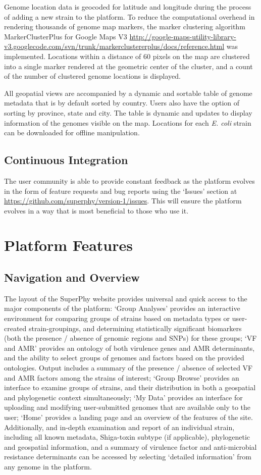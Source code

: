 \documentclass[doublespacing, linenumbers]{bmcart}
\begin{document}
Genome location data is geocoded for latitude and longitude during the process of adding a new strain to the platform. To reduce the computational overhead in  rendering thousands of genome map markers, the marker clustering algorithm MarkerClusterPlus for Google Maps V3 \url{http://google-maps-utility-library-v3.googlecode.com/svn/trunk/markerclustererplus/docs/reference.html} was implemented. Locations within a distance of 60 pixels on the map are clustered into a single marker rendered at the geometric center of the cluster, and a count of the number of clustered genome locations is displayed. 

All geopatial views are accompanied by a dynamic and sortable table of genome metadata that is by default sorted by country. Users also have the option of sorting by province, state and city. The table is dynamic and updates to display information of the genomes visible on the map. Locations for each \textit{E. coli} strain can be downloaded for offline manipulation.

\subsection{Continuous Integration}
The user community is able to provide constant feedback as the platform evolves in the form of feature requests and bug reports using the `Issues' section at \url{https://github.com/superphy/version-1/issues}.  This will ensure the platform evolves in a way that is most beneficial to those who use it.

\section{Platform Features}
\subsection{Navigation and Overview}
The layout of the SuperPhy website provides universal and quick access to the major components of the platform: `Group Analyses' provides an interactive environment for comparing groups of strains based on metadata types or user-created strain-groupings, and determining statistically significant biomarkers (both the presence / absence of genomic regions and SNPs) for these groups; `VF and AMR' provides an ontology of both virulence genes and AMR determinants, and the ability to select groups of genomes and factors based on the provided ontologies. Output includes a summary of the presence / absence of selected VF and AMR factors among the strains of interest; `Group Browse' provides an interface to examine groups of strains, and their distribution in both a geospatial and phylogenetic context simultaneously; `My Data' provides an interface for uploading and modifying user-submitted genomes that are available only to the user; `Home' provides a landing page and an overview of the features of the site.  Additionally, and in-depth examination and report of an individual strain, including all known metadata, Shiga-toxin subtype (if applicable), phylogenetic and geospatial information, and a summary of virulence factor and anti-microbial resistance determinants can be accessed by selecting `detailed information' from any genome in the platform. 
\end{document}
